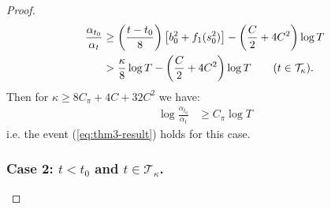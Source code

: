 \begin{proof}
\begin{align*}
    \frac{\alpha_{t_0}}{\alpha_t} &\geq \left(\frac{t-t_0}{8}\right)\left[b_0^2 + f_1(s_0^2)\right]- \left(\frac{C}{2} + 4C^2\right)\log T \\
    &> \frac{\kappa}{8}\log T - \left(\frac{C}{2} + 4C^2\right)\log T \tag{$t \in \mathcal{T}_\kappa$}. 
\end{align*}
Then for $\kappa \geq 8C_\pi + 4C + 32C^2$ we have:
\begin{align*}
    \log \frac{\alpha_{t_0}}{\alpha_t} &\geq C_\pi \log T
\end{align*}
i.e. the event (\ref{eq:thm3-result}) holds for this case. 

\subsubsection*{Case 2: $t < t_0$ and $t\in\mathcal{T}_\kappa$.}


\end{proof}
